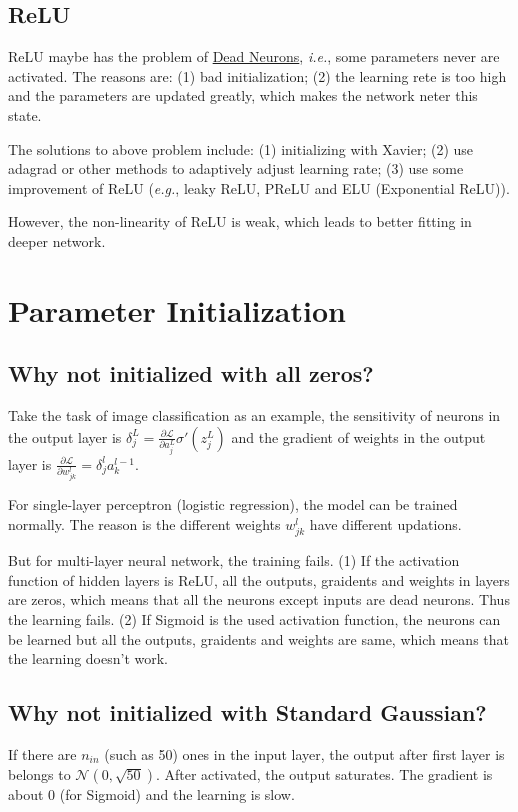 \documentclass[10pt,onecolumn]{book}
\def\ie{\emph{i.e.}}
\def\eg{\emph{e.g.}}
\begin{document}
\subsection{ReLU}
ReLU maybe has the problem of \uline{Dead Neurons}, \ie, some parameters never are activated. The reasons are: (1) bad initialization; (2) the learning rete is too high and the parameters are updated greatly, which makes the network neter this state.

The solutions to above problem include: (1) initializing with Xavier; (2) use adagrad or other methods to adaptively adjust learning rate; (3) use some improvement of ReLU (\eg, leaky ReLU, PReLU and ELU (Exponential ReLU)).

However, the non-linearity of ReLU is weak, which leads to better fitting in deeper network.

\section{Parameter Initialization}
\subsection{Why not initialized with all zeros?}
Take the task of image classification as an example, the sensitivity of neurons in the output layer is $\delta^L_j = \frac{\partial \mathcal{L}}{\partial a^L_j} \sigma'(z^L_j)$ and the gradient of weights in the output layer is $\frac{\partial \mathcal{L}}{\partial w^l_{jk}} = \delta^l_j a^{l - 1}_k$.

For single-layer perceptron (logistic regression), the model can be trained normally. The reason is the different weights $w^l_{jk}$ have different updations. 

But for multi-layer neural network, the training fails. (1) If the activation function of hidden layers is ReLU, all the outputs, graidents and weights in layers are zeros, which means that all the neurons except inputs are dead neurons. Thus the learning fails. (2) If Sigmoid is the used activation function, the neurons can be learned but all the outputs, graidents and weights are same, which means that the learning doesn't work.

\subsection{Why not initialized with Standard Gaussian?}
If there are $n_{in}$ (such as 50) ones in the input layer, the output after first layer is belongs to $\mathcal{N}(0, \sqrt{50})$. After activated, the output saturates. The gradient is about 0 (for Sigmoid) and the learning is slow.
\end{document}
